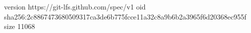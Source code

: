 version https://git-lfs.github.com/spec/v1
oid sha256:2c8867473680509317ca3de6b775fcce11a32c8a9b6b2a3965f6d20368ec955f
size 11068
